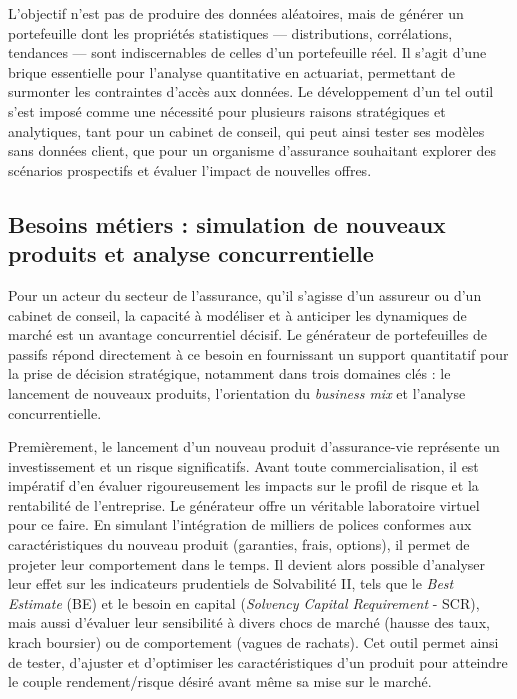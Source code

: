 L'objectif n'est pas de produire des données aléatoires, mais de générer un portefeuille dont les propriétés statistiques — distributions, corrélations, tendances — sont indiscernables de celles d'un portefeuille réel. Il s'agit d'une brique essentielle pour l'analyse quantitative en actuariat, permettant de surmonter les contraintes d'accès aux données. Le développement d'un tel outil s'est imposé comme une nécessité pour plusieurs raisons stratégiques et analytiques, tant pour un cabinet de conseil, qui peut ainsi tester ses modèles sans données client, que pour un organisme d'assurance souhaitant explorer des scénarios prospectifs et évaluer l'impact de nouvelles offres.


\subsection{Besoins métiers : simulation de nouveaux produits et analyse concurrentielle}

Pour un acteur du secteur de l'assurance, qu'il s'agisse d'un assureur ou d'un cabinet de conseil, la capacité à modéliser et à anticiper les dynamiques de marché est un avantage concurrentiel décisif. Le générateur de portefeuilles de passifs répond directement à ce besoin en fournissant un support quantitatif pour la prise de décision stratégique, notamment dans trois domaines clés : le lancement de nouveaux produits, l'orientation du \textit{business mix} et l'analyse concurrentielle.

Premièrement, le lancement d'un nouveau produit d'assurance-vie représente un investissement et un risque significatifs. Avant toute commercialisation, il est impératif d'en évaluer rigoureusement les impacts sur le profil de risque et la rentabilité de l'entreprise. Le générateur offre un véritable laboratoire virtuel pour ce faire. En simulant l'intégration de milliers de polices conformes aux caractéristiques du nouveau produit (garanties, frais, options), il permet de projeter leur comportement dans le temps. Il devient alors possible d'analyser leur effet sur les indicateurs prudentiels de Solvabilité II, tels que le \textit{Best Estimate} (BE) et le besoin en capital (\textit{Solvency Capital Requirement} - SCR), mais aussi d'évaluer leur sensibilité à divers chocs de marché (hausse des taux, krach boursier) ou de comportement (vagues de rachats). Cet outil permet ainsi de tester, d'ajuster et d'optimiser les caractéristiques d'un produit pour atteindre le couple rendement/risque désiré avant même sa mise sur le marché.

